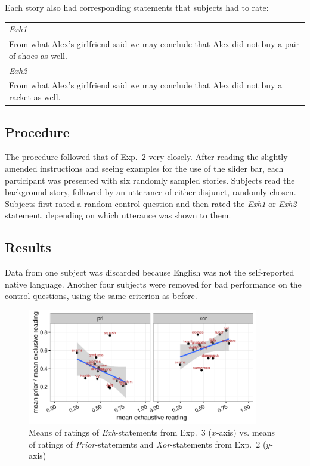 \documentclass[12pt]{article}
\begin{document}
\noindent Each story also had corresponding statements that subjects had to
rate:

\begin{center}
\begin{tabular}{p{10cm}}
  \emph{Exh1}\\
  From what Alex's girlfriend said we may conclude that Alex did not buy a pair of shoes as well. \\[.2cm]
  \emph{Exh2}\\
  From what Alex's girlfriend said we may conclude that Alex did not buy a racket as well.
\end{tabular}
\end{center}

\subsection*{Procedure}

The procedure followed that of Exp.~2 very closely. After reading the slightly amended
instructions and seeing examples for the use of the slider bar, each participant was presented
with six randomly sampled stories. Subjects read the background story, followed by an
utterance of either disjunct, randomly chosen. Subjects first rated a random control question
and then rated the \emph{Exh1} or \emph{Exh2} statement, depending on which utterance was shown
to them.

\subsection*{Results}

Data from one subject was discarded because English was not the self-reported native
language. Another four subjects were removed for bad performance on the control questions,
using the same criterion as before.

\begin{figure}
  \centering
  \includegraphics[width=0.9\textwidth]{pics_02/correlationExhXorPri.pdf}
  \caption{Means of ratings of \emph{Exh}-statements from Exp.~3 ($x$-axis) vs. means of
    ratings of \emph{Prior}-statements and \emph{Xor}-statements from
    Exp.~2 ($y$-axis)}
\label{fig:CorrelationExp1Exp4}
\end{figure}
\end{document}
